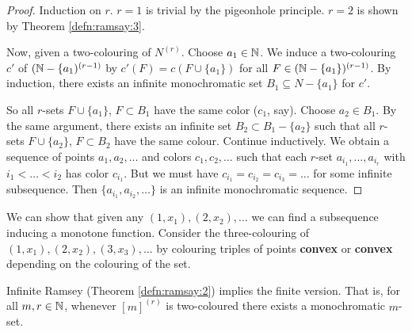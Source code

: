 \begin{proof}
  Induction on $r$.  $r = 1$ is trivial by the pigeonhole principle.
  $r = 2$ is shown by Theorem \ref{defn:ramsay:3}.

  Now, given a two-colouring of $N^{(r)}$.  Choose $a_{1} \in \mathbb{N}$.  We
  induce a two-colouring $c'$ of $(\mathbb{N} - \{ a_{1} )^{(r-1)}$ by $c'(F)
  = c(F \cup \{ a_{1} \})$  for all $F \in (\mathbb{N} - \{ a_{1} \})^{(r -
    1)}$.  By induction, there exists an infinite monochromatic set
  $B_{1} \subseteq N - \{ a_{1} \}$ for $c'$.

  So all $r$-sets $F \cup \{ a_{1} \}$, $F \subset B_{1}$ have the
  same color ($c_{1}$, say).  Choose $a_{2} \in B_{1}$.  By the same
  argument, there exists an infinite set $B_{2} \subset B_{1} - \{
  a_{2} \}$ such that all $r$-sets $F \cup \{ a_{2} \}$, $F \subset
  B_{2}$ have the same colour.  Continue inductively.  We obtain a
  sequence of points $a_{1}, a_{2}, \dots$ and colors $c_{1}, c_{2},
  \dots$ such that each $r$-set $a_{i_{1}}, \dots, a_{i_{r}}$ with
  $i_{1} < \dots < i_{2}$ has color $c_{i_{1}}$.  But we must have
  $c_{i_{1}} = c_{i_{2}} = c_{i_{3}} = \dots$ for some infinite
  subsequence.  Then $\{ a_{i_{1}}, a_{i_{2}}, \dots \}$ is an
  infinite monochromatic sequence.
\end{proof}

\begin{exmp}
  \label{defn:ramsay:4}
  We can show that given any $(1, x_{1}), (2, x_{2}), \dots$ we can
  find a subsequence inducing a monotone function.  Consider the
 three-colouring of $(1, x_{1}), (2, x_{2}), (3, x_{3}),
  \dots$ by colouring triples of points \textbf{convex} or
  \textbf{convex} depending on the colouring of the set.
\end{exmp}

\begin{thm}
  \label{defn:ramsay:5}
  Infinite Ramsey (Theorem \ref{defn:ramsay:2}) implies the finite
  version.  That is, for all $m, r \in \mathbb{N}$, whenever $[m]^{(r)}$ is
  two-coloured there exists a monochromatic $m$-set.
\end{thm}

